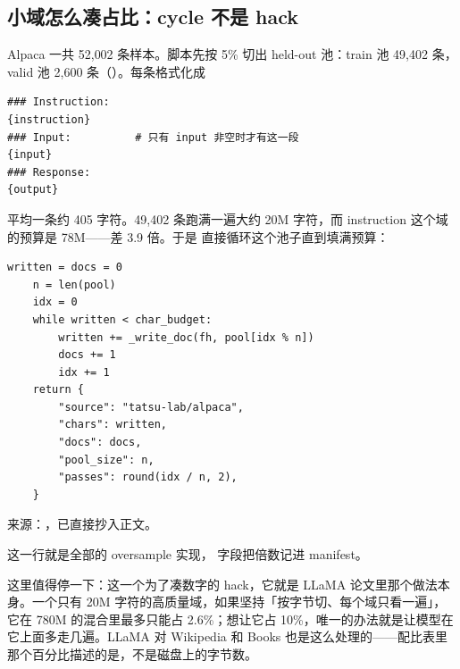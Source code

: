 \subsection{小域怎么凑占比：cycle 不是 hack}
\label{subsec:cycle}

Alpaca 一共 52{,}002 条样本。脚本先按 5\% 切出 held-out 池：train 池 49{,}402 条，valid 池 2{,}600 条（）。每条格式化成

\begin{lstlisting}[style=hlplain]
### Instruction:
{instruction}
### Input:          # 只有 input 非空时才有这一段
{input}
### Response:
{output}
\end{lstlisting}

平均一条约 405 字符。49{,}402 条跑满一遍大约 20M 字符，而 instruction 这个域的预算是 78M——差 3.9 倍。于是  直接循环这个池子直到填满预算：

\begin{lstlisting}[style=hlnum, firstnumber=137]
    written = docs = 0
    n = len(pool)
    idx = 0
    while written < char_budget:
        written += _write_doc(fh, pool[idx % n])
        docs += 1
        idx += 1
    return {
        "source": "tatsu-lab/alpaca",
        "chars": written,
        "docs": docs,
        "pool_size": n,
        "passes": round(idx / n, 2),
    }
\end{lstlisting}
\noindent 来源：，已直接抄入正文。

 这一行就是全部的 oversample 实现， 字段把倍数记进 manifest。

这里值得停一下：这一个为了凑数字的 hack，它就是 LLaMA 论文里那个做法本身。一个只有 20M 字符的高质量域，如果坚持「按字节切、每个域只看一遍」，它在 780M 的混合里最多只能占 2.6\%；想让它占 10\%，唯一的办法就是让模型在它上面多走几遍。LLaMA 对 Wikipedia 和 Books 也是这么处理的——配比表里那个百分比描述的是，不是磁盘上的字节数。

